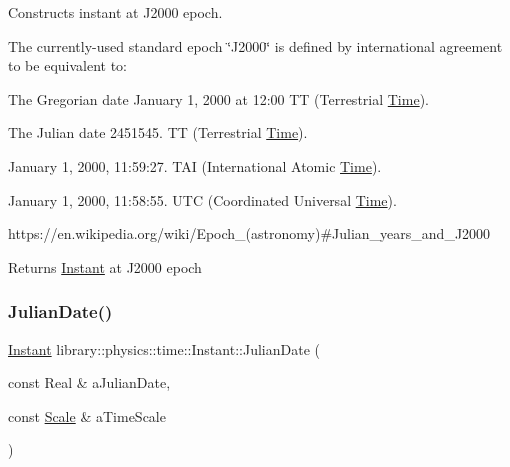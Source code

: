 Constructs instant at J2000 epoch. 

The currently-\/used standard epoch \char`\"{}\+J2000\char`\"{} is defined by international agreement to be equivalent to\+:
\begin{DoxyItemize}
\item The Gregorian date January 1, 2000 at 12\+:00 TT (Terrestrial \hyperlink{classlibrary_1_1physics_1_1time_1_1_time}{Time}).
\item The Julian date 2451545. TT (Terrestrial \hyperlink{classlibrary_1_1physics_1_1time_1_1_time}{Time}).
\item January 1, 2000, 11\+:59\+:27. T\+AI (International Atomic \hyperlink{classlibrary_1_1physics_1_1time_1_1_time}{Time}).
\item January 1, 2000, 11\+:58\+:55. U\+TC (Coordinated Universal \hyperlink{classlibrary_1_1physics_1_1time_1_1_time}{Time}).
\end{DoxyItemize}

https\+://en.wikipedia.\+org/wiki/\+Epoch\+\_\+(astronomy)\#\+Julian\+\_\+years\+\_\+and\+\_\+\+J2000

\begin{DoxyReturn}{Returns}
\hyperlink{classlibrary_1_1physics_1_1time_1_1_instant}{Instant} at J2000 epoch 
\end{DoxyReturn}
\mbox{\label{classlibrary_1_1physics_1_1time_1_1_instant_a06f5e092a3a5ee126c9521c12e349d56}} 
\subsubsection{\texorpdfstring{Julian\+Date()}{JulianDate()}}
{\footnotesize\ttfamily \hyperlink{classlibrary_1_1physics_1_1time_1_1_instant}{Instant} library\+::physics\+::time\+::\+Instant\+::\+Julian\+Date (\begin{DoxyParamCaption}\item[{const Real \&}]{a\+Julian\+Date,  }\item[{const \hyperlink{namespacelibrary_1_1physics_1_1time_a09d2bc9fbc7b0b5f92e1419bd655e6bb}{Scale} \&}]{a\+Time\+Scale }\end{DoxyParamCaption})\hspace{0.3cm}{\ttfamily [static]}}



